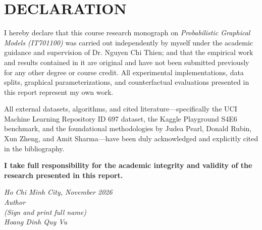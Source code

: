 \chapter*{DECLARATION}
I hereby declare that this course research monograph on \emph{Probabilistic Graphical Models (IT701100)} was carried out independently by myself under the academic guidance and supervision of Dr. Nguyen Chi Thien; and that the empirical work and results contained in it are original and have not been submitted previously for any other degree or course credit. All experimental implementations, data splits, graphical parameterizations, and counterfactual evaluations presented in this report represent my own work.

All external datasets, algorithms, and cited literature—specifically the UCI Machine Learning Repository ID 697 dataset, the Kaggle Playground S4E6 benchmark, and the foundational methodologies by Judea Pearl, Donald Rubin, Xun Zheng, and Amit Sharma—have been duly acknowledged and explicitly cited in the bibliography.

\textbf{I take full responsibility for the academic integrity and validity of the research presented in this report.}

\vspace*{1cm}
\begin{flushright}
	\begin{minipage}{8.75cm}
		\centering\itshape
		Ho Chi Minh City, November 2026\\
		Author\\[2.5cm]
		(Sign and print full name)\\
		Hoang Dinh Quy Vu
	\end{minipage}
\end{flushright}
\newpage
